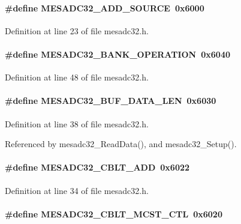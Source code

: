 \paragraph[{MESADC32\_\-ADD\_\-SOURCE}]{\setlength{\rightskip}{0pt plus 5cm}\#define MESADC32\_\-ADD\_\-SOURCE~0x6000}\hfill\label{mesadc32_8h_ad56c49021a43e38e4e3a890660634dc3}


Definition at line 23 of file mesadc32.h.
\paragraph[{MESADC32\_\-BANK\_\-OPERATION}]{\setlength{\rightskip}{0pt plus 5cm}\#define MESADC32\_\-BANK\_\-OPERATION~0x6040}\hfill\label{mesadc32_8h_a4a51723f89e937665bc5d7cd5820db52}


Definition at line 48 of file mesadc32.h.
\paragraph[{MESADC32\_\-BUF\_\-DATA\_\-LEN}]{\setlength{\rightskip}{0pt plus 5cm}\#define MESADC32\_\-BUF\_\-DATA\_\-LEN~0x6030}\hfill\label{mesadc32_8h_a2c81b5e2ec668d58b9c1ec3d0f13f012}


Definition at line 38 of file mesadc32.h.

Referenced by mesadc32\_\-ReadData(), and mesadc32\_\-Setup().
\paragraph[{MESADC32\_\-CBLT\_\-ADD}]{\setlength{\rightskip}{0pt plus 5cm}\#define MESADC32\_\-CBLT\_\-ADD~0x6022}\hfill\label{mesadc32_8h_a5c13a95f6e57c7452718d3150166effc}


Definition at line 34 of file mesadc32.h.
\paragraph[{MESADC32\_\-CBLT\_\-MCST\_\-CTL}]{\setlength{\rightskip}{0pt plus 5cm}\#define MESADC32\_\-CBLT\_\-MCST\_\-CTL~0x6020}\hfill\label{mesadc32_8h_a7a2477a7a87faf1a60d76a7d6b838dbe}


